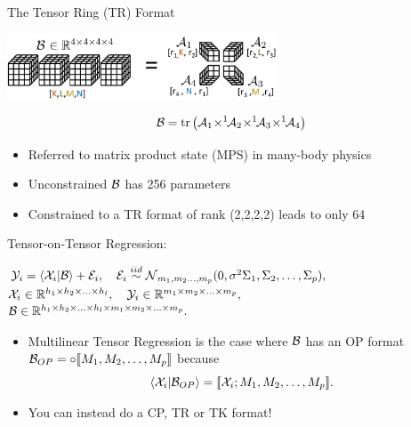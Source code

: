 \documentclass{beamer}
\begin{document}






\begin{frame}{The Tensor Ring (TR)  Format}

 \begin{center}
     \includegraphics[width=8cm]{figures/TR-nonetwork-crop.pdf}
\end{center}
$$
\mB = \tr\left(
\mA_1 \!\times^1\!\!
\mA_2 \!\times^1\!\!
\mA_3 \!\times^1\!\!
\mA_4
\right)
$$

 \begin{itemize}
\item Referred to matrix product state (MPS) in many-body physics
\item Unconstrained $\mathcal B$ has 256 parameters
\item Constrained to a TR format of rank (2,2,2,2) leads to only 64
\end{itemize}

\end{frame}


\begin{frame}
\begin{block}{Tensor-on-Tensor Regression:}
\begin{center}
$\mathcal Y_{i} =  \langle \mathcal X_{i}|\mathcal B \rangle + \mathcal E_{i}
,\quad  \mathcal E_{i}\overset{iid}{\sim} \operatorname{\mathcal N}_{m_1,m_2\hdots,m_p}(0, \sigma^2 \Sigma_1,\Sigma_2,\hdots,\Sigma_p),$
\\\vspace*{.1cm}
$\mathcal X_i \in \mathbb{R}^{h_1\times h_2\times\hdots \times h_l}
,\quad
\mathcal Y_i \in \mathbb{R}^{m_1\times m_2\times\hdots \times m_p},$
\\\vspace*{.1cm}
$\mathcal B \in \mathbb{R}^{h_1\times h_2\times\hdots \times h_l\times m_1\times m_2\times\hdots \times m_p}.$
\end{center}
\end{block}

\begin{itemize}
\item Multilinear Tensor Regression is the case where $\mathcal B$ has an OP format $\mathcal B_{OP} = \circ[\![M_1,M_2,\dots,M_p]\!]$ because
$$
 \langle \mathcal X_{i}|\mathcal B_{OP} \rangle 
 =
 [\![\mathcal X_i; M_1,M_2,\dots,M_p]\!].
$$

\item You can instead do a CP, TR or TK format!
\end{itemize}

\end{frame}
\end{document}
